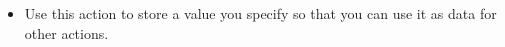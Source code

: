 \begin{itemize}
\item Use this action to store a value you specify so that you can use it as data for other actions. 
\end{itemize}
